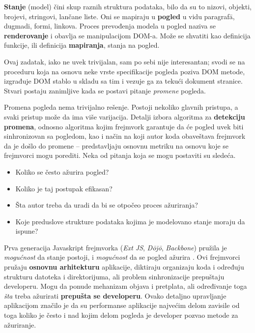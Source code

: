 \textbf{Stanje} (model) čini skup raznih struktura podataka, bilo da su to nizovi, objekti, brojevi, stringovi, lančane liste.
Oni se mapiraju u \textbf{pogled} u vidu paragraf\=a, dugmadi, formi, linkova.
Proces prevođenja modela u pogled naziva se \textbf{renderovanje} i obavlja se manipulacijom DOM-a.
Može se shvatiti kao definicija funkcije, ili definicija \textbf{mapiranja}, stanja na pogled.

Ovaj zadatak, iako ne uvek trivijalan, sam po sebi nije interesantan; svodi se na proceduru koja na osnovu neke vrste specifikacije pogleda poziva DOM metode, izgrađuje DOM stablo u skladu sa tim i vezuje ga za tekući dokument stranice.
Stvari postaju zanimljive kada se postavi pitanje \emph{promene} pogleda.

Promena pogleda nema trivijalno rešenje.
Postoji nekoliko glavnih pristupa, a svaki pristup može da ima više varijacija.
Detalji izbora algoritma za \textbf{detekciju promena}, odnosno algoritma kojim frejmvork garantuje da će pogled uvek biti sinhronizovan sa pogledom, kao i način na koji autor koda obaveštava frejmvork da je došlo do promene -- predstavljaju osnovnu metriku na osnovu koje se frejmvorci mogu porediti.
Neka od pitanja koja se mogu postaviti su sledeća.

\begin{itemize}
  \item Koliko se često ažurira pogled?
  \item Koliko je taj postupak efikasan?
  \item Šta autor treba da uradi da bi se otpočeo proces ažuriranja?
  \item Koje preduslove strukture podataka kojima je modelovano stanje moraju da ispune?
\end{itemize}

Prva generacija Javaskript frejmvorka (\textsl{Ext JS}, \textsl{D\=oj\=o}, \textsl{Backbone}) pružila je \emph{mogućnost} da stanje postoji, i \emph{mogućnost} da se pogled ažurira \cite{teropa:cd}.
Ovi frejmvorci pružaju \textbf{osnovnu arhitekturu} aplikacije, diktiraju organizaju koda i određuju strukturu datoteka i direktorijuma, ali problem sinhronizacije prepuštaju developeru.
Mogu da ponude mehanizam objava i pretplata, ali određivanje toga \emph{šta} treba ažurirati \textbf{prepušta se developeru}.
Ovako detaljno upravljanje aplikacijom značilo je da su performanse aplikacije najvećim delom zavisile od toga koliko je često i nad kojim delom pogleda je developer pozvao metode za ažuriranje.

